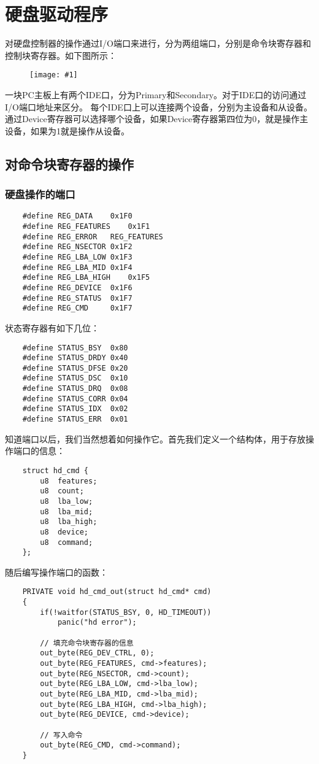 \documentclass[a4paper,left=2.5cm,right=2.5cm,11pt]{article}
\newcommand{\fic}[1]{\begin{figure}[H]
		\center
		\texttt{[image: \#1]}
	\end{figure}}
\begin{document}
\tableofcontents

\clearpage

\section{硬盘驱动程序}
	对硬盘控制器的操作通过I/O端口来进行，分为两组端口，分别是命令块寄存器和控制块寄存器。如下图所示：
	\fic{1.png}

	一块PC主板上有两个IDE口，分为Primary和Secondary。对于IDE口的访问通过I/O端口地址来区分。
	每个IDE口上可以连接两个设备，分别为主设备和从设备。通过Device寄存器可以选择哪个设备，如果Device寄存器第四位为0，就是操作主设备，如果为1就是操作从设备。

\subsection{对命令块寄存器的操作}
\subsubsection{硬盘操作的端口}
	\begin{lstlisting}
	#define REG_DATA	0x1F0
	#define REG_FEATURES	0x1F1
	#define REG_ERROR	REG_FEATURES
	#define REG_NSECTOR	0x1F2
	#define REG_LBA_LOW	0x1F3
	#define REG_LBA_MID	0x1F4
	#define REG_LBA_HIGH	0x1F5
	#define REG_DEVICE	0x1F6
	#define REG_STATUS	0x1F7
	#define REG_CMD		0x1F7
	\end{lstlisting}

	状态寄存器有如下几位：
	\begin{lstlisting}
	#define	STATUS_BSY	0x80
	#define	STATUS_DRDY	0x40
	#define	STATUS_DFSE	0x20
	#define	STATUS_DSC	0x10
	#define	STATUS_DRQ	0x08
	#define	STATUS_CORR	0x04
	#define	STATUS_IDX	0x02
	#define	STATUS_ERR	0x01
	\end{lstlisting}

	知道端口以后，我们当然想着如何操作它。首先我们定义一个结构体，用于存放操作端口的信息：
	\begin{lstlisting}
	struct hd_cmd {
		u8	features;
		u8	count;
		u8	lba_low;
		u8	lba_mid;
		u8	lba_high;
		u8	device;
		u8	command;
	};
	\end{lstlisting}

	随后编写操作端口的函数：
	\begin{lstlisting}
	PRIVATE void hd_cmd_out(struct hd_cmd* cmd)
	{
		if(!waitfor(STATUS_BSY, 0, HD_TIMEOUT))
			panic("hd error");
		
		// 填充命令块寄存器的信息
		out_byte(REG_DEV_CTRL, 0);
		out_byte(REG_FEATURES, cmd->features);
		out_byte(REG_NSECTOR, cmd->count);
		out_byte(REG_LBA_LOW, cmd->lba_low);
		out_byte(REG_LBA_MID, cmd->lba_mid);
		out_byte(REG_LBA_HIGH, cmd->lba_high);
		out_byte(REG_DEVICE, cmd->device);
		
		// 写入命令
		out_byte(REG_CMD, cmd->command);
	}
	\end{lstlisting}
\end{document}
